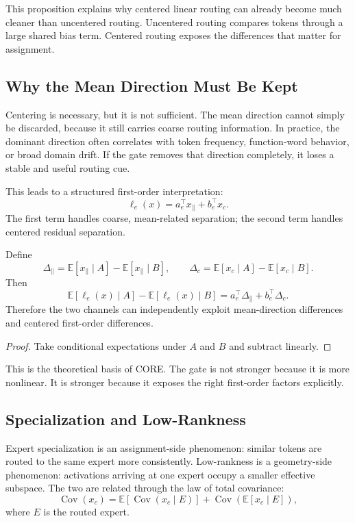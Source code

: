 This proposition explains why centered linear routing can already become much cleaner than uncentered routing. Uncentered routing compares tokens through a large shared bias term. Centered routing exposes the differences that matter for assignment.

\subsection{Why the Mean Direction Must Be Kept}
Centering is necessary, but it is not sufficient. The mean direction cannot simply be discarded, because it still carries coarse routing information. In practice, the dominant direction often correlates with token frequency, function-word behavior, or broad domain drift. If the gate removes that direction completely, it loses a stable and useful routing cue.

This leads to a structured first-order interpretation:
$$
\ell_e(x)=a_e^\top x_{\parallel}+b_e^\top x_c.
$$
The first term handles coarse, mean-related separation; the second term handles centered residual separation.

\begin{proposition}
Define
$$
\Delta_{\parallel}
=
\mathbb{E}[x_{\parallel}\mid A]-\mathbb{E}[x_{\parallel}\mid B],
\qquad
\Delta_c
=
\mathbb{E}[x_c\mid A]-\mathbb{E}[x_c\mid B].
$$
Then
$$
\mathbb{E}[\ell_e(x)\mid A]-\mathbb{E}[\ell_e(x)\mid B]
=
a_e^\top \Delta_{\parallel}+b_e^\top \Delta_c.
$$
Therefore the two channels can independently exploit mean-direction differences and centered first-order differences.
\end{proposition}

\begin{proof}
Take conditional expectations under $A$ and $B$ and subtract linearly.
\end{proof}

This is the theoretical basis of CORE. The gate is not stronger because it is more nonlinear. It is stronger because it exposes the right first-order factors explicitly.

\subsection{Specialization and Low-Rankness}
Expert specialization is an assignment-side phenomenon: similar tokens are routed to the same expert more consistently. Low-rankness is a geometry-side phenomenon: activations arriving at one expert occupy a smaller effective subspace. The two are related through the law of total covariance:
$$
\operatorname{Cov}(x_c)
=
\mathbb{E}[\operatorname{Cov}(x_c\mid E)]
+
\operatorname{Cov}(\mathbb{E}[x_c\mid E]),
$$
where $E$ is the routed expert.

